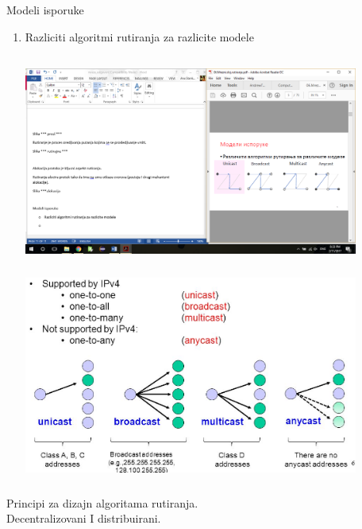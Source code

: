 \documentclass{article} %
\begin{document}
\newpage
Modeli isporuke
\begin{enumerate}
	\item Razliciti algoritmi rutiranja za razlicite modele
	\begin{center}
		\includegraphics[width=11cm, height=7cm]{modeli}\\
		\includegraphics[width=11cm, height=7cm]{modeli2}\\
	\end{center}
\end{enumerate}
Principi za dizajn algoritama rutiranja.\\
Decentralizovani I distribuirani.
\end{document}
